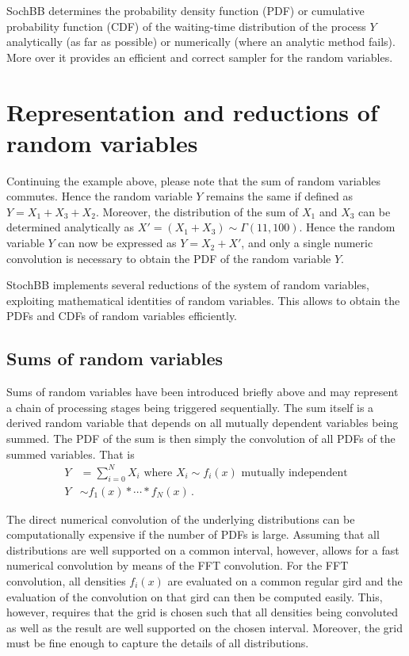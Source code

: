 \documentclass[a4paper, 10pt]{paper}
\begin{document}
SochBB determines the probability density function (PDF) or cumulative probability function
(CDF) of the waiting-time distribution of the process $Y$ analytically (as far as
possible) or numerically (where an analytic method fails). More over it provides an efficient
and correct sampler for the random variables.


\section{Representation and reductions of random variables}
Continuing the example above, please note that the sum of random variables commutes. Hence the
random variable $Y$ remains the same if defined as $Y = X_1 + X_3 + X_2$. Moreover, the 
distribution of the sum of $X_1$ and $X_3$ can be determined analytically as 
$X' = (X_1+X_3)\sim\Gamma(11,100)$. Hence the random variable $Y$ can now be expressed as 
$Y = X_2 + X'$, and only a single numeric convolution is necessary to obtain the PDF of the
random variable $Y$. 

StochBB implements several reductions of the system of random variables,
exploiting mathematical identities of random variables. This allows to obtain the PDFs and CDFs
of random variables efficiently.

\subsection{Sums of random variables}
Sums of random variables have been introduced briefly above and may represent a chain of processing
stages being triggered sequentially. The sum itself is a derived random variable that depends on all
mutually dependent variables being summed. The PDF of the sum is then simply the convolution of all
PDFs of the summed variables. That is
\begin{align}
 Y &= \sum_{i=0}^NX_i\text{ where } X_i \sim f_i(x)\text{ mutually independent} \nonumber \\
 Y &\sim f_1(x) \ast \cdots \ast f_N(x)\,. \nonumber
\end{align}

The direct numerical convolution of the underlying distributions can be computationally expensive if the
number of PDFs is large. Assuming that all distributions are well supported on a common interval, however, 
allows for a fast numerical convolution by means of the FFT convolution. For the FFT convolution, all 
densities $f_i(x)$ are evaluated on a common regular gird and the evaluation of the convolution on that gird
can then be computed easily. This, however, requires that the grid is chosen such that all densities being
convoluted as well as the result are well supported on the chosen interval. Moreover, the grid must be fine 
enough to capture the details of all distributions. 
\end{document}
